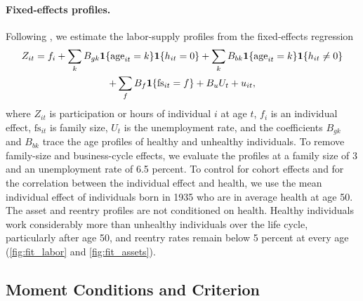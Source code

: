 \paragraph{Fixed-effects profiles.} Following \citet{french2005effects}, we estimate the labor-supply profiles from the fixed-effects regression
\begin{multline*}
Z_{it}=f_i+\sum_{k}B_{gk}\mathbf{1}\{\text{age}_{it}=k\}\mathbf{1}\{h_{it}=0\}+\sum_{k}B_{bk}\mathbf{1}\{\text{age}_{it}=k\}\mathbf{1}\{h_{it}\neq0\}\\
+\sum_{f}B_{f}\mathbf{1}\{\text{fs}_{it}=f\}+B_{u}U_{t}+u_{it},
\end{multline*}
where $Z_{it}$ is participation or hours of individual $i$ at age $t$, $f_i$ is an individual effect, $\text{fs}_{it}$ is family size, $U_t$ is the unemployment rate, and the coefficients $B_{gk}$ and $B_{bk}$ trace the age profiles of healthy and unhealthy individuals. To remove family-size and business-cycle effects, we evaluate the profiles at a family size of 3 and an unemployment rate of 6.5 percent. %
To control for cohort effects and for the correlation between the individual effect and health, we use the mean individual effect of individuals born in 1935 who are in average health at age 50. %
The asset and reentry profiles are not conditioned on health. Healthy individuals work considerably more than unhealthy individuals over the life cycle, particularly after age 50, and reentry rates remain below 5 percent at every age (\autoref{fig:fit_labor} and \autoref{fig:fit_assets}).

\subsection{Moment Conditions and Criterion}

